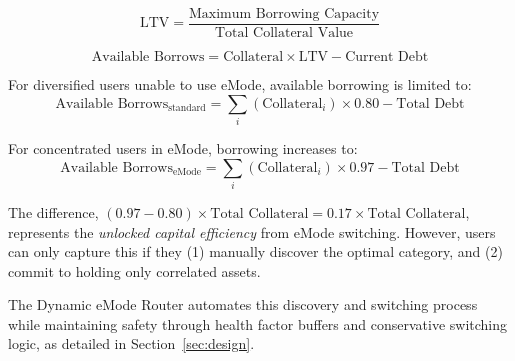 \begin{equation}\label{eq:ltv}
\text{LTV} = \frac{\text{Maximum Borrowing Capacity}}{\text{Total Collateral Value}}
\end{equation}

\begin{equation}\label{eq:available-borrows}
\text{Available Borrows} = \text{Collateral} \times \text{LTV} - \text{Current Debt}
\end{equation}

For diversified users unable to use eMode, available borrowing is limited to:
\begin{equation}
\text{Available Borrows}_{\text{standard}} = \sum_i (\text{Collateral}_i) \times 0.80 - \text{Total Debt}
\end{equation}

For concentrated users in eMode, borrowing increases to:
\begin{equation}
\text{Available Borrows}_{\text{eMode}} = \sum_i (\text{Collateral}_i) \times 0.97 - \text{Total Debt}
\end{equation}

The difference, $(0.97 - 0.80) \times \text{Total Collateral} = 0.17 \times \text{Total Collateral}$, represents the \textit{unlocked capital efficiency} from eMode switching. However, users can only capture this if they (1) manually discover the optimal category, and (2) commit to holding only correlated assets.

The Dynamic eMode Router automates this discovery and switching process while maintaining safety through health factor buffers and conservative switching logic, as detailed in Section~\ref{sec:design}.
